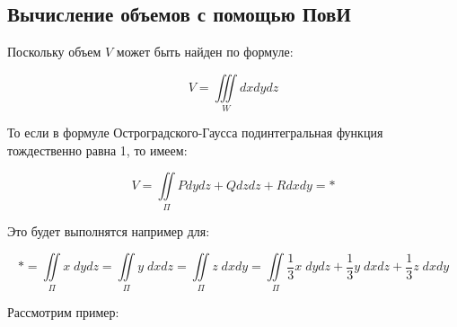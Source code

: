 \documentclass[../../main.tex]{subfiles}
\begin{document}
	
	
	\subsection{Вычисление объемов с помощью ПовИ}
	Поскольку объем $V$ может быть найден по формуле:
	
	\[ V = \iiint \limits_W dx dy dz \]
	
	То если в формуле Остроградского-Гаусса подинтегральная функция тождественно равна 1, то имеем:
	
	\[ V = \iint \limits_{\Pi} Pdydz+Qdzdz+Rdxdy = * \]
	
	Это будет выполнятся например для:
	
	\[ *=  \iint \limits_{\Pi} x \; dydz = \iint \limits_{\Pi} y \; dxdz = \iint \limits_{\Pi} z \; dxdy = \iint \limits_{\Pi}  \frac{1}{3} x \; dydz + \frac{1}{3} y \; dxdz + \frac{1}{3} z \; dxdy \]
	
	Рассмотрим пример:
	
\end{document}
